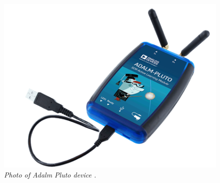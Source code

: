 \documentclass[en,printmode]{mgr}
\begin{document}
			\begin{figure}[!htb]
    			\centering
   				\includegraphics[width=\textwidth]{images/plutoimg.png}
    			\caption{\textit{Photo of Adalm Pluto device \cite{pluto_photo}.}}
			\end{figure}
			\newpage
\end{document}
